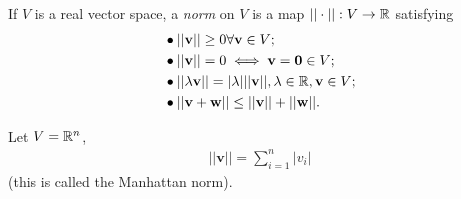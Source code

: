 \documentclass[a4paper]{article}
\begin{document}
\begin{defi}
If $V$ is a real vector space, a \emph{norm} on $V$ is a map $||\cdot|| : V \to \mathbb{R}$ satisfying
\begin{equation*}
\begin{aligned}
&\bullet ||\mathbf{v}|| \geq 0 \forall \mathbf{v}\in V;\\
&\bullet ||\mathbf{v}|| = 0 \iff \mathbf{v}=\mathbf{0} \in V;\\
&\bullet ||\lambda \mathbf{v}|| = |\lambda| ||\mathbf{v}||, \lambda \in \mathbb{R}, \mathbf{v} \in V;\\
&\bullet ||\mathbf{v}+\mathbf{w}|| \leq ||\mathbf{v}|| + ||\mathbf{w}||.
\end{aligned}
\end{equation*}
\end{defi}

\begin{eg}
Let $V = \mathbb{R}^n$,
\begin{equation*}
\begin{aligned}
||\mathbf{v}|| = \sum_{i=1}^n |v_i|
\end{aligned}
\end{equation*}
(this is called the Manhattan norm).
\end{eg}
\end{document}

